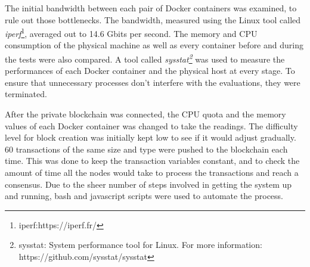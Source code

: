 \documentclass[english]{tktltiki}
\begin{document}
The initial bandwidth between each pair of Docker containers was examined, to rule out those bottlenecks. The bandwidth, measured using the Linux tool called \textit{iperf}\footnote{iperf:https://iperf.fr/}, averaged out to 14.6 Gbits per second. The memory and CPU consumption of the physical machine as well as every container before and during the tests were also compared. A tool called \textit{sysstat\footnote{sysstat: System performance tool for Linux. For more information: https://github.com/sysstat/sysstat}} was used to measure the performances of each Docker container and the physical host at every stage. To ensure that unnecessary processes don't interfere with the evaluations, they were terminated.

After the private blockchain was connected, the CPU quota and the memory values of each Docker container was changed to take the readings. The difficulty level for block creation was initially kept low to see if it would adjust gradually. 60 transactions of the same size and type were pushed to the blockchain each time. This was done to keep the transaction variables constant, and to check the amount of time all the nodes would take to process the transactions and reach a consensus. Due to the sheer number of steps involved in getting the system up and running, bash and javascript scripts were used to automate the process.
\end{document}
